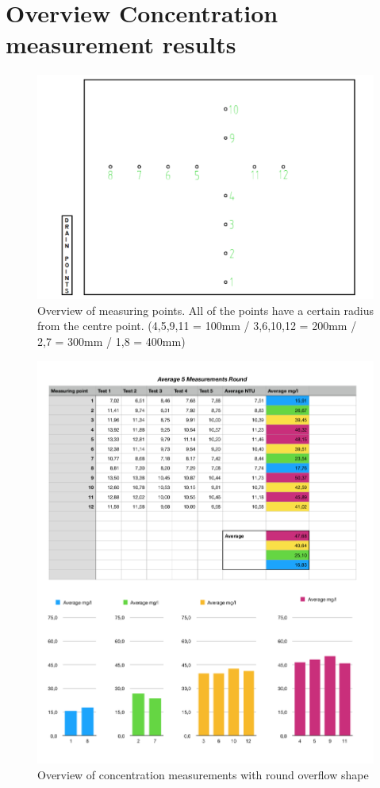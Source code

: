 \chapter{Overview Concentration measurement results}
\label{app:Concentration}

\begin{figure}[ht]
    \centering
    \includegraphics[width=\linewidth]{Images/meetpunten.png}
    \caption{Overview of measuring points. All of the points have a certain radius from the centre point. (4,5,9,11 = 100mm / 3,6,10,12 = 200mm / 2,7 = 300mm / 1,8 = 400mm)}
\end{figure}



\begin{figure}[ht]
    \centering
    \includegraphics[width=\linewidth]{Images/Average_Round.png}
    \caption{Overview of concentration measurements with round overflow shape}
\end{figure}

